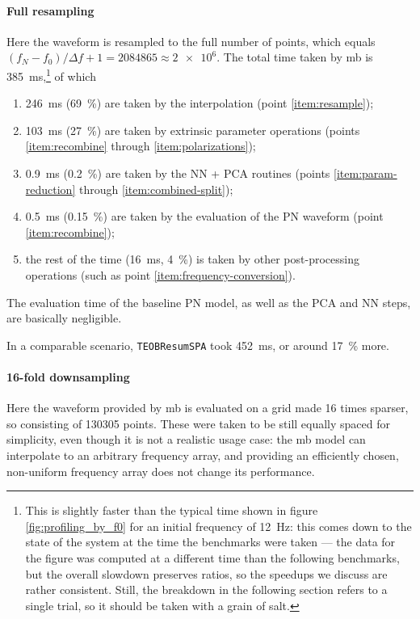 \documentclass[main.tex]{subfiles}
\begin{document}
\paragraph{Full resampling}
Here the waveform is resampled to the full number of points, which equals \((f_N - f_0 ) / \Delta f + 1 = 2084865 \approx \num{2e6}\). 
The total time taken by \ac{mb} is \SI{385}{ms},\footnote{This is slightly faster than the typical time shown in figure \ref{fig:profiling_by_f0} for an initial frequency of \SI{12}{Hz}: this comes down to the state of the system at the time the benchmarks were taken --- the data for the figure was computed at a different time than the following benchmarks, but the overall slowdown preserves ratios, so the speedups we discuss are rather consistent.
Still, the breakdown in the following section refers to a single trial, so it should be taken with a grain of salt.} of which 
\begin{enumerate}
    \item \SI{246}{ms} (\SI{69}{\%}) are taken by the interpolation (point \ref{item:resample});
    \item \SI{103}{ms} (\SI{27}{\%}) are taken by extrinsic parameter operations (points \ref{item:recombine} through \ref{item:polarizations});
    \item \SI{0.9}{ms} (\SI{0.2}{\%}) are taken by the \ac{NN} + \ac{PCA} routines (points \ref{item:param-reduction} through \ref{item:combined-split});
    \item \SI{0.5}{ms} (\SI{0.15}{\%}) are taken by the evaluation of the \ac{PN} waveform (point \ref{item:recombine});
    \item the rest of the time (\SI{16}{ms}, \SI{4}{\%}) is taken by other post-processing operations (such as point \ref{item:frequency-conversion}).
\end{enumerate}

The evaluation time of the baseline \ac{PN} model, as well as the \ac{PCA} and \ac{NN} steps, are basically negligible. 

In a comparable scenario, \texttt{TEOBResumSPA} took \SI{452}{ms}, or around \SI{17}{\%} more. 

\paragraph{16-fold downsampling}

Here the waveform provided by \ac{mb} is evaluated on a grid made 16 times sparser, so consisting of 130305 points.
These were taken to be still equally spaced for simplicity, even though it is not a realistic usage case: the \ac{mb} model can interpolate to an arbitrary frequency array, and providing an efficiently chosen, non-uniform frequency array does not change its performance. 
\end{document}
